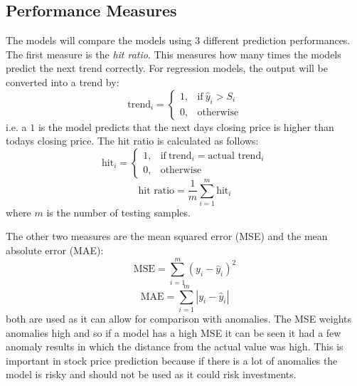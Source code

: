 \documentclass[11pt,a4paper]{article}
\numberwithin{equation}{section}
\begin{document}
\subsection{Performance Measures}
\label{ss:pm}
The models will compare the models using 3 different prediction performances. The first measure is the {\em hit ratio}. This measures how many times the models predict the next trend correctly. For regression models, the output will be converted into a trend by:
\[
\text{trend}_{i} =
    \begin{cases}
      1, & \text{if}\ \hat{y}_{i} > S_{i} \\
      0, & \text{otherwise}
    \end{cases}
\]
i.e. a $1$ is the model predicts that the next days closing price is higher than todays closing price. The hit ratio is calculated as follows:
\[
\text{hit}_{i} =
    \begin{cases}
      1, & \text{if}\ \text{trend}_{i} = \text{actual trend}_{i} \\
      0, & \text{otherwise}
    \end{cases}
\]
\[
\text{hit ratio} = \frac{1}{m}\sum_{i=1}^{m} \text{hit}_{i}
\]
where $m$ is the number of testing samples.

The other two measures are the mean squared error (MSE) and the mean absolute error (MAE):
\[
\text{MSE} = \sum_{i=1}^{m}(y_{i} - \hat{y}_{i})^2
\]
\[
\text{MAE} = \sum_{i=1}^{m} |y_{i}-\hat{y}_{i}|
\]
both are used as it can allow for comparison with anomalies. The MSE weights anomalies high and so if a model has a high MSE it can be seen it had a few anomaly results in which the distance from the actual value was high. This is important in stock price prediction because if there is a lot of anomalies the model is risky and should not be used as it could risk investments.




\end{document}

